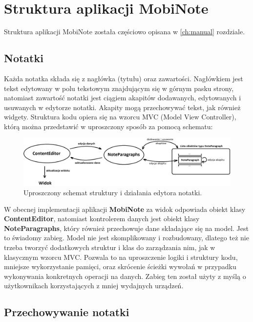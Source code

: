 \chapter{Struktura aplikacji MobiNote}

Struktura aplikacji MobiNote została częściowo opisana w \ref{ch:manual} rozdziale.

\section{Notatki}

Każda notatka składa się z nagłówka (tytułu) oraz zawartości.
Nagłówkiem jest tekst edytowany w polu tekstowym znajdującym się w górnym pasku strony, natomiast zawartość notatki jest ciągiem akapitów dodawanych, edytowanych i usuwanych w edytorze notatki. Akapity mogą przechowywać tekst, jak również widgety. Struktura kodu opiera się na wzorcu MVC (Model View Controller), którą można przedstawić w uproszczony sposób za pomocą schematu:

\begin{figure}[ht]
    \centering
    \includegraphics[width=\linewidth]{images/ContentEditor_podzial.png}
    \caption{Uproszczony schemat struktury i działania edytora notatki.}
\end{figure}

W obecnej implementacji aplikacji \textbf{MobiNote} za widok odpowiada obiekt klasy \textbf{ContentEditor}, natomiast kontrolerem danych jest obiekt klasy \textbf{NoteParagraphs}, który również przechowuje dane składające się na model. Jest to świadomy zabieg. Model nie jest skomplikowany i rozbudowany, dlatego też nie trzeba tworzyć dodatkowych struktur i klas do zarządzania nim, jak w klasycznym wzorcu MVC. Pozwala to na uproszczenie logiki i struktury kodu, mniejsze wykorzystanie pamięci, oraz skrócenie ścieżki wywołań w przypadku wykonywania konkretnych operacji na danych. Zabieg ten został użyty z myślą o użytkownikach korzystających z mniej wydajnych urządzeń.

\section{Przechowywanie notatki}

